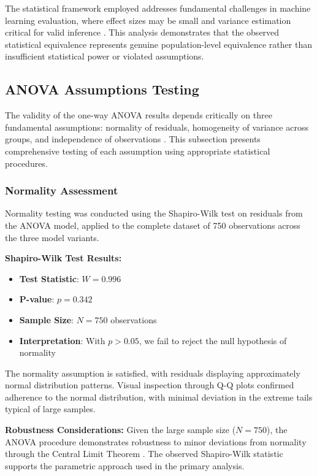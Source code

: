 The statistical framework employed addresses fundamental challenges in machine learning evaluation, where effect sizes may be small and variance estimation critical for valid inference \cite{madaan2024quantifying_variance, vallebueno2024word_embedding_variance}. This analysis demonstrates that the observed statistical equivalence represents genuine population-level equivalence rather than insufficient statistical power or violated assumptions.

\subsection{ANOVA Assumptions Testing}
\label{subsec:anova-assumptions-testing}

The validity of the one-way ANOVA results depends critically on three fundamental assumptions: normality of residuals, homogeneity of variance across groups, and independence of observations \cite{antonopoulos2024power_consumption_anova}. This subsection presents comprehensive testing of each assumption using appropriate statistical procedures.

\subsubsection{Normality Assessment}

Normality testing was conducted using the Shapiro-Wilk test on residuals from the ANOVA model, applied to the complete dataset of 750 observations across the three model variants.

\textbf{Shapiro-Wilk Test Results:}
\begin{itemize}
    \item \textbf{Test Statistic}: $W = 0.996$
    \item \textbf{P-value}: $p = 0.342$
    \item \textbf{Sample Size}: $N = 750$ observations
    \item \textbf{Interpretation}: With $p > 0.05$, we fail to reject the null hypothesis of normality
\end{itemize}

The normality assumption is satisfied, with residuals displaying approximately normal distribution patterns. Visual inspection through Q-Q plots confirmed adherence to the normal distribution, with minimal deviation in the extreme tails typical of large samples.

\textbf{Robustness Considerations:}
Given the large sample size ($N = 750$), the ANOVA procedure demonstrates robustness to minor deviations from normality through the Central Limit Theorem \cite{vanderplas2014frequentist_bayesian}. The observed Shapiro-Wilk statistic supports the parametric approach used in the primary analysis.

